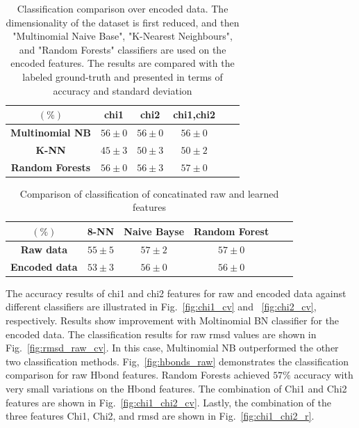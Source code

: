 \documentclass{article}
\begin{document}
\begin{table}
\begin{center}
\begin{tabular}{|c|c|c|c|c|c|}
\hline
 $(\%)$ &\textbf{chi1} & \textbf{chi2} & \textbf{chi1,chi2} \\
\hline\hline
\textbf{Multinomial NB} & $56 \pm 0$  & $56 \pm 0 $ & $56 \pm 0$ \\
\hline
\textbf{K-NN} & $45 \pm 3 $ & $50 \pm 3 $ & $50 \pm 2 $ \\
\hline
\textbf{Random Forests} & $56 \pm 0 $ & $56 \pm 3 $ & $57 \pm 0$ \\
\hline
\end{tabular}
\caption{Classification comparison over encoded data. The dimensionality of the dataset is first reduced, and then "Multinomial Naive Base", "K-Nearest Neighbours", and "Random Forests" classifiers are used on the encoded features. The results are compared with the labeled ground-truth and presented in terms of accuracy and standard deviation \label{tab:encodedClassifier}}
\end{center}
\end{table}

\begin{table}
\begin{center}
\begin{tabular}{|c|c|c|c|c|c|}
\hline
 $(\%)$ &\textbf{8-NN} & \textbf{Naive Bayse} & \textbf{Random Forest} \\
\hline\hline
\textbf{Raw data} & $55 \pm 5 $  & $57 \pm 2 $ & $57 \pm 0$ \\
\hline
\textbf{Encoded data} & $53 \pm 3 $ & $56 \pm 0 $ & $56 \pm 0$ \\
\hline
\end{tabular}
\caption{ Comparison of classification of concatinated raw and learned features \label{tab:rawVSencoded}}
\end{center}
\end{table}

The accuracy results of chi1 and chi2 features for raw and encoded data against different classifiers are illustrated in Fig.~\ref{fig:chi1_cv} and ~\ref{fig:chi2_cv}, respectively. Results show improvement with Moltinomial BN classifier for the encoded data. The classification results for raw rmsd values are shown in Fig.~\ref{fig:rmsd_raw_cv}. In this case, Multinomial NB outperformed the other two classification methods. Fig,~\ref{fig:hbonds_raw} demonstrates the classification comparison for raw Hbond features. Random Forests achieved $57 \%$ accuracy with very small variations on the Hbond features. The combination of Chi1 and Chi2 features are shown in Fig.~\ref{fig:chi1_chi2_cv}. Lastly, the combination of the three features Chi1, Chi2, and rmsd are shown in Fig.~\ref{fig:chi1_chi2_r}.
\end{document}
